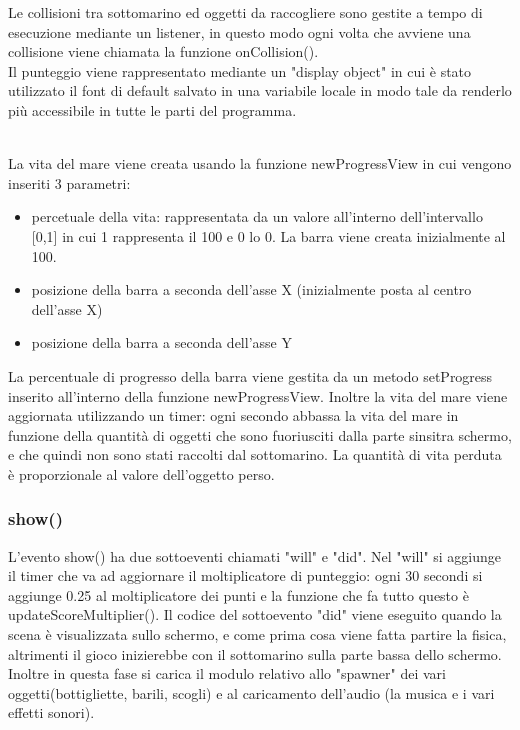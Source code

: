 \documentclass[12pt]{article}
\begin{document}
Le collisioni tra sottomarino ed oggetti da raccogliere sono gestite a tempo di esecuzione mediante un listener, in questo modo ogni volta che avviene una collisione viene chiamata la funzione onCollision(). 
\\

Il punteggio viene rappresentato mediante un "display object" in cui è stato utilizzato il font di default salvato in una variabile locale in modo tale da renderlo più accessibile in tutte le parti del programma. 

\\
La vita del mare viene creata usando la funzione newProgressView in cui vengono inseriti 3 parametri:
\begin{itemize}
    \item percetuale della vita: rappresentata da un valore all'interno dell'intervallo [0,1] in cui 1 rappresenta il 100 e 0 lo 0. La barra viene creata inizialmente al 100.
    \item posizione della barra a seconda dell'asse X (inizialmente posta al centro dell'asse X)
    \item posizione della barra a seconda dell'asse Y
\end{itemize}
La percentuale di progresso della barra viene gestita da un metodo setProgress inserito all'interno della funzione newProgressView. Inoltre la vita del mare viene aggiornata utilizzando un timer: ogni secondo abbassa la vita del mare in funzione della quantità di oggetti che sono fuoriusciti dalla parte sinsitra schermo, e che quindi non sono stati raccolti dal sottomarino. La quantità di vita perduta è proporzionale al valore dell'oggetto perso.

\subsubsection{show()}
L'evento show() ha due sottoeventi chiamati "will" e "did". Nel "will" si aggiunge il timer che va ad aggiornare il moltiplicatore di punteggio: ogni 30 secondi si aggiunge 0.25 al moltiplicatore dei punti e la funzione che fa tutto questo è updateScoreMultiplier(). Il codice del sottoevento "did" viene eseguito quando la scena è visualizzata sullo schermo, e come prima cosa viene fatta partire la fisica, altrimenti il gioco inizierebbe con il sottomarino sulla parte bassa dello schermo. Inoltre in questa fase si carica il modulo relativo allo "spawner" dei vari oggetti(bottigliette, barili, scogli) e al caricamento dell'audio (la musica e i vari effetti sonori).
\end{document}
